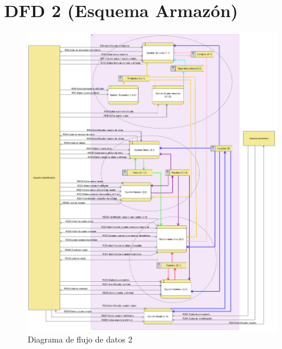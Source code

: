 \documentclass[a4paper,12pt]{report}
\begin{document}
\section{DFD 2 (Esquema Armazón)}
\label{sec-6-1}
\begin{figure}[!htp]
\centering
\includegraphics[width=1\linewidth]{./refinamientos/dfd2.png}
\caption{Diagrama de flujo de datos 2}
\label{fig:Diagrama de flujo de datos 2}
\medskip
\footnotesize
{}
\end{figure}
\end{document}
